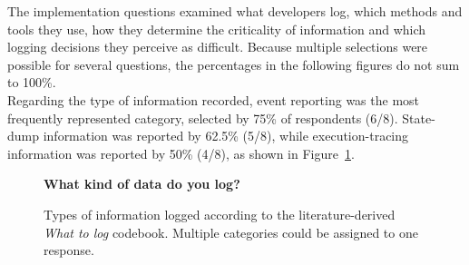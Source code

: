 The implementation questions examined what developers log, which methods and tools
they use, how they determine the criticality of information and which logging
decisions they perceive as difficult. Because multiple selections were possible for
several questions, the percentages in the following figures do not sum to 100\%.
\\
Regarding the type of information recorded, event reporting was the most frequently
represented category, selected by 75\% of respondents (6/8). State-dump information
was reported by 62.5\% (5/8), while execution-tracing information was reported by
50\% (4/8), as shown in Figure~\ref{fig:results-what-to-log}.

\begin{figure}[H]
    \centering
    \begin{minipage}{0.92\textwidth}
        \centering
        \textbf{\small
        What kind of data do you log?}
    \end{minipage}
    \vspace{0.7em}
    \caption{Types of information logged according to the
    literature-derived \textit{What to log} codebook.
    Multiple categories could be assigned to one response.}
    \label{fig:results-what-to-log}
\end{figure}

